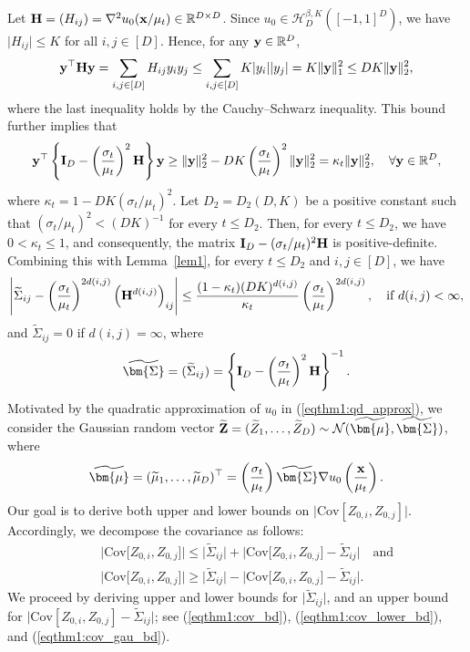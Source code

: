 \documentclass[11pt,a4paper,final]{article}
\numberwithin{equation}{section}
\theoremstyle{remark}
\def\cH{\mathcal H}
\def\cN{\mathcal N}
\newcommand{\bH}{{\bf H}}
\newcommand{\bI}{{\bf I}}
\newcommand{\bx}{{\bf x}}
\newcommand{\by}{{\bf y}}
\newcommand{\bZ}{{\bf Z}}
\newcommand{\bbR}{{\mathbb R}}
\newcommand{\bSigma}{\bm{\Sigma}}
\newcommand{\bmu}{\bm{\mu}}
\newcommand{\be}{\begin{equation}}
\newcommand{\ee}{\end{equation}}
\newcommand{\bean}{\setlength\arraycolsep{1pt}\begin{eqnarray*}}
\newcommand{\eean}{\end{eqnarray*}}
\begin{document}
Let $ \bH = (H_{ij}) = \nabla^2 u_0 ( \bx / \mu_t) \in \bbR^{D \times D}$.
Since $u_0 \in  \cH^{\beta,K}_{D}([-1,1]^{D})$, we have $\vert H_{ij} \vert \leq K$ for all $i,j \in [D]$.
Hence, for any $\by \in \bbR^{D}$, 
\bean
\by^{\top} \bH \by
= \sum_{i,j \in [D]} H_{ij} y_i y_j
\leq \sum_{i,j \in [D]} K \vert y_i \vert \vert y_j \vert = K \| \by\|_1^2 \leq DK \|\by \|_2^2,
\eean
where the last inequality holds by the Cauchy--Schwarz inequality.
This bound further implies that
\be
\by^{\top} \left\{ \bI_{D} -  \left( \frac{\sigma_t}{\mu_t} \right)^2 \bH \right\} \by
\geq \| \by \|_2^2 - D K \left( \frac{\sigma_t}{\mu_t} \right)^2 \| \by \|_2^2
= 
\kappa_{t} \| \by \|_2^2, \quad \forall \by \in \bbR^{D},
\label{eqthm1:matrix_pd}
\ee
where $\kappa_{t} = 1- D K (\sigma_t /\mu_t)^2 $. 
Let $D_{2} = D_{2}(D,K)$ be a positive constant such that $ (\sigma_{t} / \mu_{t})^2 < (DK)^{-1} $ for every $t \leq D_{2}$.
Then, for every $t \leq D_{2}$, we have $0 < \kappa_{t} \leq 1$, and consequently, the matrix $\bI_{D} - (\sigma_t / \mu_t)^{2} \bH  $ is positive-definite.
Combining this with Lemma~\ref{lem1}, for every $t \leq D_{2}$ and $i,j \in [D]$, we have
\be
\left\vert \widetilde \Sigma_{ij} -  \left( \frac{\sigma_{t}}{\mu_{t}} \right)^{2 d(i,j) } \left( \bH^{d(i,j)} \right)_{ij}  \right\vert
\leq   \frac{ (1 - \kappa_t)  ( D K )^{ d(i,j)}  }{ \kappa_t } \left( \frac{\sigma_{t}}{\mu_{t}} \right)^{2 d(i,j)}
, \quad \text{if } d(i,j) < \infty,
\label{eqthm1:prop}
 \ee
and $\widetilde \Sigma_{ij} = 0$ if $d(i,j) = \infty$,  where 
\bean
\widetilde \bSigma = (\widetilde \Sigma_{ij}) = \left\{ \bI_{D} -  \left( \frac{\sigma_t}{\mu_t} \right)^2 \bH \right\}^{-1}.
\eean
Motivated by the quadratic approximation of $u_0$ in (\ref{eqthm1:qd_approx}), we consider the Gaussian random vector $\widetilde \bZ = (\widetilde Z_{1},\ldots, \widetilde Z_{D}) \sim \cN(\widetilde \bmu, \widetilde \bSigma)$, where 
\bean
\widetilde \bmu
= ( \widetilde \mu_1, \ldots, \widetilde \mu_{D})^{\top}
= \left( \frac{\sigma_t}{\mu_t} \right)  \widetilde \bSigma \nabla u_0 \left( \frac{\bx}{\mu_{t}} \right).
\eean
Our goal is to derive both upper and lower bounds on $\vert \text{Cov}[Z_{0,i} , Z_{0,j}] \vert $.
Accordingly, we decompose the covariance as follows:
\bean
&& \Big\vert \text{Cov} \big[ Z_{0,i}, Z_{0,j} \big] \Big\vert
\leq \Big\vert \widetilde \Sigma_{ij} \Big\vert  + \Big\vert \text{Cov} 
\big[ Z_{0,i}, Z_{0,j} \big] - \widetilde \Sigma_{ij} \Big\vert 
\quad \text{and}
\\
&& \Big\vert \text{Cov} \big[ Z_{0,i}, Z_{0,j} \big] \Big\vert
\geq \Big\vert \widetilde \Sigma_{ij} \Big\vert  - \Big\vert \text{Cov} \big[ Z_{0,i}, Z_{0,j} \big] - \widetilde \Sigma_{ij} \Big\vert.
\eean
We proceed by deriving upper and lower bounds for $\vert \widetilde \Sigma_{ij} \vert$, 
and an upper bound for $\vert \text{Cov}[Z_{0,i}, Z_{0,j}] - \widetilde \Sigma_{ij} \vert$; 
see (\ref{eqthm1:cov_bd}), (\ref{eqthm1:cov_lower_bd}), and (\ref{eqthm1:cov_gau_bd}).
\end{document}
